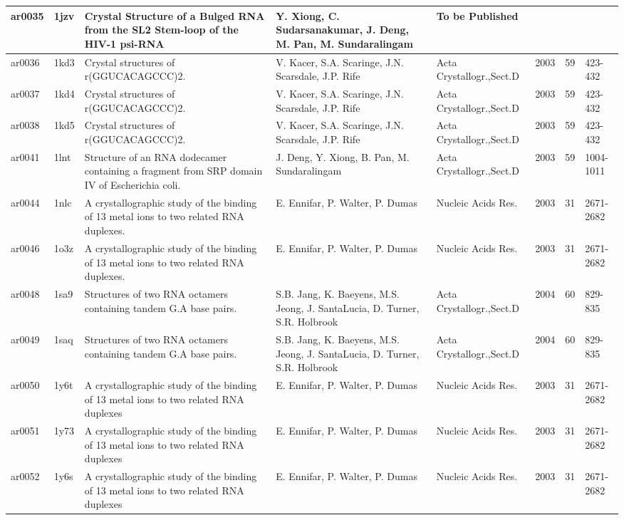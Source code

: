 {\begin{landscape}
\begin{center}
\begin{longtable}{p{0.76cm}   p{0.74cm}  p{5.2cm}   p{5.2cm}  p{3.2cm}
    p{0.6cm} p{0.9cm} p{1.8cm}}
ar0035 & 1jzv & Crystal Structure of a Bulged RNA from the SL2 Stem-loop of the HIV-1 psi-RNA & Y. Xiong, C. Sudarsanakumar, J. Deng, M. Pan, M. Sundaralingam & To be Published & \multicolumn{1}{l}{} & \multicolumn{1}{l}{} &   \\ \hline
ar0036 & 1kd3 & Crystal structures of r(GGUCACAGCCC)2. & V. Kacer, S.A. Scaringe, J.N. Scarsdale, J.P. Rife & Acta Crystallogr.,Sect.D & 2003 & 59 & 423-432 \\ \hline
ar0037 & 1kd4 & Crystal structures of r(GGUCACAGCCC)2. & V. Kacer, S.A. Scaringe, J.N. Scarsdale, J.P. Rife & Acta Crystallogr.,Sect.D & 2003 & 59 & 423-432 \\ \hline
ar0038 & 1kd5 & Crystal structures of r(GGUCACAGCCC)2. & V. Kacer, S.A. Scaringe, J.N. Scarsdale, J.P. Rife & Acta Crystallogr.,Sect.D & 2003 & 59 & 423-432 \\ \hline
ar0041 & 1lnt & Structure of an RNA dodecamer containing a fragment from SRP domain IV of Escherichia coli. & J. Deng, Y. Xiong, B. Pan, M. Sundaralingam & Acta Crystallogr.,Sect.D & 2003 & 59 & 1004-1011 \\ \hline
ar0044 & 1nlc & A crystallographic study of the binding of 13 metal ions to two related RNA duplexes. & E. Ennifar, P. Walter, P. Dumas & Nucleic Acids Res. & 2003 & 31 & 2671-2682 \\ \hline
ar0046 & 1o3z & A crystallographic study of the binding of 13 metal ions to two related RNA duplexes. & E. Ennifar, P. Walter, P. Dumas & Nucleic Acids Res. & 2003 & 31 & 2671-2682 \\ \hline
ar0048 & 1sa9 & Structures of two RNA octamers containing tandem G.A base pairs. & S.B. Jang, K. Baeyens, M.S. Jeong, J. SantaLucia, D. Turner, S.R. Holbrook & Acta Crystallogr.,Sect.D & 2004 & 60 & 829-835 \\ \hline
ar0049 & 1saq & Structures of two RNA octamers containing tandem G.A base pairs. & S.B. Jang, K. Baeyens, M.S. Jeong, J. SantaLucia, D. Turner, S.R. Holbrook & Acta Crystallogr.,Sect.D & 2004 & 60 & 829-835 \\ \hline
ar0050 & 1y6t & A crystallographic study of the binding of 13 metal ions to two related RNA duplexes & E. Ennifar, P. Walter, P. Dumas & Nucleic Acids Res. & 2003 & 31 & 2671-2682 \\ \hline
ar0051 & 1y73 & A crystallographic study of the binding of 13 metal ions to two related RNA duplexes & E. Ennifar, P. Walter, P. Dumas & Nucleic Acids Res. & 2003 & 31 & 2671-2682 \\ \hline
ar0052 & 1y6s & A crystallographic study of the binding of 13 metal ions to two related RNA duplexes & E. Ennifar, P. Walter, P. Dumas & Nucleic Acids Res. & 2003 & 31 & 2671-2682 \\ \hline

\end{longtable}
\end{center}
\end{landscape}}
